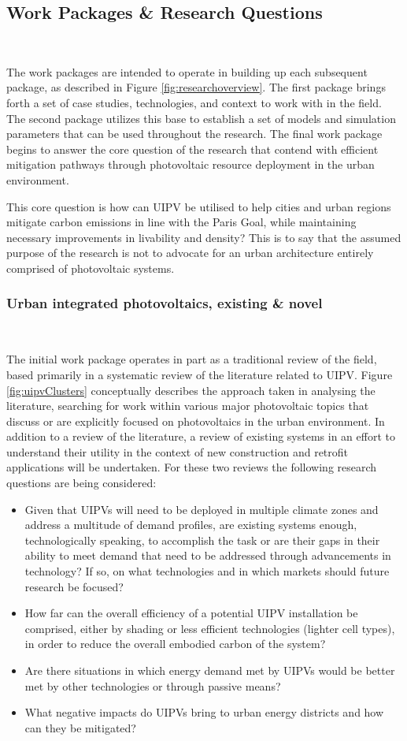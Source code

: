 \subsection{Work Packages \& Research Questions}\

The work packages are intended to operate in building up each subsequent package, as described in Figure \ref{fig:researchoverview}. The first package brings forth a set of case studies, technologies, and context to work with in the field. The second package utilizes this base to establish a set of models and simulation parameters that can be used throughout the research. The final work package begins to answer the core question of the research that contend with efficient mitigation pathways through photovoltaic resource deployment in the urban environment. 

This core question is how can UIPV be utilised to help cities and urban regions mitigate carbon emissions in line with the Paris Goal, while maintaining necessary improvements in livability and density? This is to say that the assumed purpose of the research is not to advocate for an urban architecture entirely comprised of photovoltaic systems.


\subsubsection{Urban integrated photovoltaics, existing \& novel}\

The initial work package operates in part as a traditional review of the field, based primarily in a systematic review of the literature related to UIPV. Figure \ref{fig:uipvClusters} conceptually describes the approach taken in analysing the literature, searching for work within various major photovoltaic topics that discuss or are explicitly focused on photovoltaics in the urban environment. In addition to a review of the literature, a review of existing systems in an effort to understand their utility in the context of new construction and retrofit applications will be undertaken. For these two reviews the following research questions are being considered: 

\begin{itemize}
    \item Given that UIPVs will need to be deployed in multiple climate zones and address a multitude of demand profiles, are existing systems enough, technologically speaking, to accomplish the task or are their gaps in their ability to meet demand that need to be addressed through advancements in technology? If so, on what technologies and in which markets should future research be focused?
    \item How far can the overall efficiency of a potential UIPV installation be comprised, either by shading or less efficient technologies (lighter cell types), in order to reduce the overall embodied carbon of the system?
    \item Are there situations in which energy demand met by UIPVs would be better met by other technologies or through passive means?
    \item What negative impacts do UIPVs bring to urban energy districts and how can they be mitigated?
\end{itemize}

